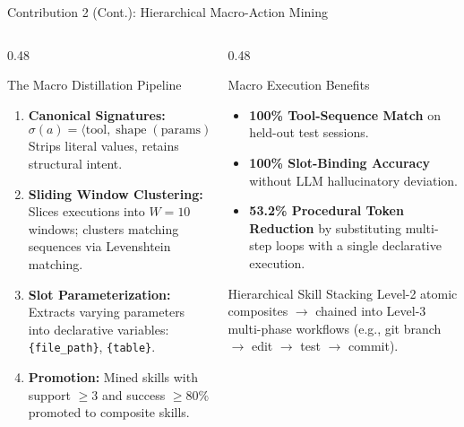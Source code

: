 \documentclass[aspectratio=169,10pt]{beamer}
\begin{document}
\begin{frame}{Contribution 2 (Cont.): Hierarchical Macro-Action Mining}
  \begin{columns}[T,onlytextwidth]
    \begin{column}{0.48\textwidth}
      \begin{block}{The Macro Distillation Pipeline}
        \begin{enumerate}
          \item \textbf{Canonical Signatures:}
            \begin{equation*}
              \sigma(a) = \langle \text{tool}, \operatorname{shape}(\text{params}), \text{status} \rangle
            \end{equation*}
            Strips literal values, retains structural intent.
          \item \textbf{Sliding Window Clustering:} Slices executions into $W=10$ windows; clusters matching sequences via Levenshtein matching.
          \item \textbf{Slot Parameterization:} Extracts varying parameters into declarative variables: \texttt{\{file\_path\}}, \texttt{\{table\}}.
          \item \textbf{Promotion:} Mined skills with support $\ge 3$ and success $\ge 80\%$ promoted to composite skills.
        \end{enumerate}
      \end{block}
    \end{column}

    \begin{column}{0.48\textwidth}
      \begin{exampleblock}{Macro Execution Benefits}
        \begin{itemize}
          \item \textbf{100\% Tool-Sequence Match} on held-out test sessions.
          \item \textbf{100\% Slot-Binding Accuracy} without LLM hallucinatory deviation.
          \item \textbf{53.2\% Procedural Token Reduction} by substituting multi-step loops with a single declarative execution.
        \end{itemize}
      \end{exampleblock}
      \vspace{0.3em}
      \begin{block}{Hierarchical Skill Stacking}
        Level-2 atomic composites $\to$ chained into Level-3 multi-phase workflows (e.g., git branch $\to$ edit $\to$ test $\to$ commit).
      \end{block}
    \end{column}
  \end{columns}
\end{frame}
\end{document}
